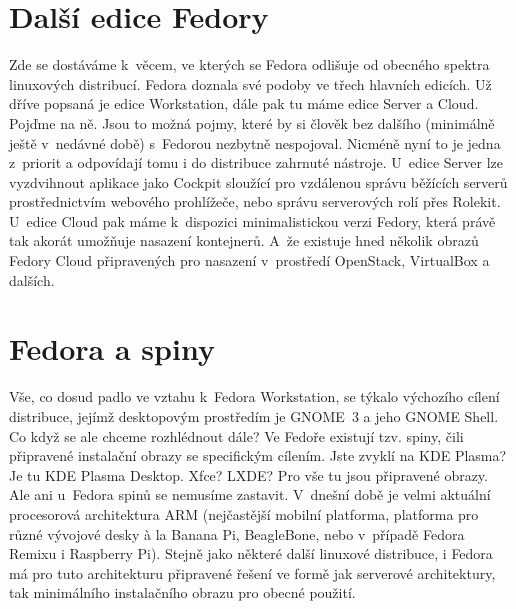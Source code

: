 \section*{Další edice Fedory}
Zde se dostáváme k~věcem, ve kterých se Fedora odlišuje od obecného spektra linuxových distribucí. Fedora doznala své podoby ve třech hlavních edicích. Už dříve popsaná je edice Workstation, dále pak tu máme edice Server a Cloud. Pojďme na ně. Jsou to možná pojmy, které by si člověk bez dalšího (minimálně ještě v~nedávné době) s~Fedorou nezbytně nespojoval. Nicméně nyní to je jedna z~priorit a odpovídají tomu i do distribuce zahrnuté nástroje. U~edice Server lze vyzdvihnout aplikace jako Cockpit sloužící pro vzdálenou správu běžících serverů prostřednictvím webového prohlížeče, nebo správu serverových rolí přes Rolekit. U~edice Cloud pak máme k~dispozici minimalistickou verzi Fedory, která právě tak akorát umožňuje nasazení kontejnerů. A~že existuje hned několik obrazů Fedory Cloud připravených pro nasazení v~prostředí OpenStack, VirtualBox a dalších.

\section*{Fedora a spiny}
Vše, co dosud padlo ve vztahu k~Fedora Workstation, se týkalo výchozího cílení distribuce, jejímž desktopovým prostředím je GNOME~3 a jeho GNOME Shell. Co když se ale chceme rozhlédnout dále? Ve Fedoře existují tzv. spiny, čili připravené instalační obrazy se specifickým cílením. Jste zvyklí na KDE Plasma? Je tu KDE Plasma Desktop. Xfce? LXDE? Pro vše tu jsou připravené obrazy. Ale ani u~Fedora spinů se nemusíme zastavit. V~dnešní době je velmi aktuální procesorová architektura ARM (nejčastější mobilní platforma, platforma pro různé vývojové desky à la Banana Pi, BeagleBone, nebo v~případě Fedora Remixu i Raspberry Pi). Stejně jako některé další linuxové distribuce, i Fedora má pro tuto architekturu připravené řešení ve formě jak serverové architektury, tak minimálního instalačního obrazu pro obecné použití.
